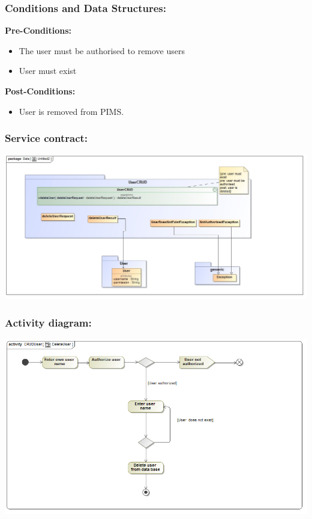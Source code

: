 \subsubsection{Conditions and Data Structures:}
\textbf{Pre-Conditions:}
	\begin{itemize}
	\item The user must be authorised to remove users
	\item User must exist
	\end{itemize}
\textbf{Post-Conditions:}
	\begin{itemize}
	\item User is removed from PIMS.
	\end{itemize}	
\subsubsection{Service contract:}
\includegraphics[width=1\linewidth]{./Graphics/6.jpg}
\subsubsection{Activity diagram:}
\includegraphics[width=1\linewidth]{./Graphics/DeleteUser.png}
